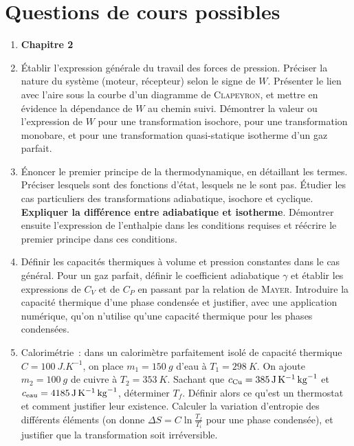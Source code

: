 \documentclass[a4paper, 12pt, final, garamond]{book}
\begin{document}
\section{Questions de cours possibles}

\begin{enumerate}[label=\sqenumi]
    \item[] \textbf{Chapitre 2}

    \item Établir l'expression générale du travail des forces de pression.
      Préciser la nature du système (moteur, récepteur) selon le signe de $W$.
      Présenter le lien avec l'aire sous la courbe d'un diagramme de
      \textsc{Clapeyron}, et mettre en évidence la dépendance de $W$ au chemin
      suivi. Démontrer la valeur ou l'expression de $W$ pour une transformation
      isochore, pour une transformation monobare, et pour une transformation
      quasi-statique isotherme d'un gaz parfait.

    \item Énoncer le premier principe de la thermodynamique, en détaillant les
      termes. Préciser lesquels sont des fonctions d'état, lesquels ne le sont
      pas. Étudier les cas particuliers des transformations adiabatique,
      isochore et cyclique. \textbf{Expliquer la différence entre adiabatique et
      isotherme}. Démontrer ensuite l'expression de l'enthalpie dans les
      conditions requises et réécrire le premier principe dans ces conditions.

    \item Définir les capacités thermiques à volume et pression constantes dans
      le cas général. Pour un gaz parfait, définir le coefficient adiabatique
      $\gamma$ et établir les expressions de $C_V$ et de $C_P$ en passant par la
      relation de \textsc{Mayer}. Introduire la capacité thermique d'une phase
      condensée et justifier, avec une application numérique, qu'on n'utilise
      qu'une capacité thermique pour les phases condensées.

    \item Calorimétrie~: dans un calorimètre parfaitement isolé de capacité
      thermique $C = \SI{100}{J.K^{-1}}$, on place $m_1 = \SI{150}{g}$ d'eau à
      $T_1 = \SI{298}{K}$. On ajoute $m_2 = \SI{100}{g}$ de cuivre à $T_2 =
      \SI{353}{K}$. Sachant que $c_{\rm Cu} = \SI{385}{J.K^{-1}.kg^{-1}}$ et
      $c_{\rm eau} = \SI{4185}{J.K^{-1}.kg^{-1}}$, déterminer $T_f$. Définir
      alors ce qu'est un thermostat et comment justifier leur existence.
      Calculer la variation d'entropie des différents éléments (on donne $\Delta
      S = C \ln \frac{T_f}{T_{i}}$ pour une phase condensée), et justifier que
      la transformation soit irréversible.


\end{enumerate}
\end{document}
